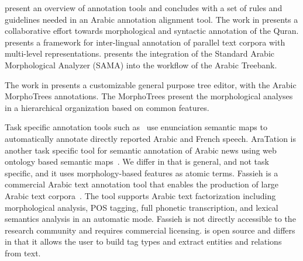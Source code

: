 \cite{kholidy2010towards} present an overview of annotation tools 
and concludes with a set of rules and guidelines needed in an Arabic annotation alignment tool.
The work in \cite{dukes2011supervised} presents a collaborative effort towards morphological and syntactic annotation of the Quran.
\cite{dorr2010interlingual} presents a framework for inter-lingual 
annotation of parallel text corpora with multi-level representations.
\cite{kulick2010consistent} presents the integration of the 
Standard Arabic Morphological Analyzer (SAMA) into the workflow of the Arabic Treebank.

The work in \cite{smrz2004morphotrees} presents %
a customizable general purpose tree editor, with the Arabic MorphoTrees annotations. 
The MorphoTrees present the morphological analyses in a hierarchical organization based on common features. 

Task specific annotation tools such as~\cite{alrahabi2006semantic}
use enunciation semantic maps to automatically annotate 
directly reported Arabic and French speech.
AraTation is another task specific tool for semantic annotation of 
Arabic news using web ontology based semantic maps~\cite{saleh2009aratation}.
We differ in that \framework is general, and not task specific, and it uses 
morphology-based features as atomic terms.
Fassieh is a commercial Arabic text annotation tool that enables the production of large Arabic text corpora~\cite{attia2009fassieh}.
The tool supports Arabic text factorization including morphological analysis, POS tagging, 
full phonetic transcription, and lexical semantics analysis in an automatic mode.
Fassieh is not directly accessible to the research community and requires commercial licensing.
\framework is open source and differs in that it allows the user to build tag types and extract entities and relations from text.

